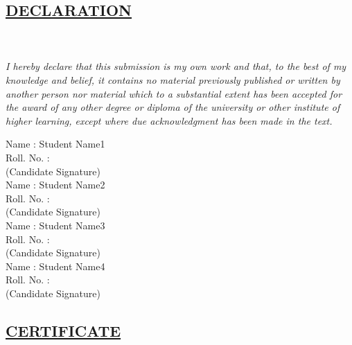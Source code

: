 \begin{center}
\chapter*{\size \underline{\textbf{DECLARATION}}}   
\end{center}\\
\\
\doublespacing
\textit{I hereby declare that this submission is my own work and that, to the best of my knowledge and belief, it contains no material previously published or written by another person nor material which to a substantial extent has been accepted for the award of any other degree or diploma of the university or other institute of higher learning, except where due acknowledgment has been made in the text.}
\\
\begin{flushleft}
Name : Student Name1\\
Roll. No. :   \\
\vspace{5mm}
(Candidate Signature) \\
\vspace{5mm}
Name : Student Name2\\
Roll. No. :   \\
\vspace{5mm}
(Candidate Signature) \\
\vspace{5mm}
Name : Student Name3\\
Roll. No. :   \\
\vspace{5mm}
(Candidate Signature) \\
\vspace{5mm}
Name : Student Name4\\
Roll. No. :   \\
\vspace{5mm}
(Candidate Signature) \\
\vspace{5mm}
\end{flushleft}
\restoregeometry
\newpage
\begin{center}
\chapter*{\size \underline {\textbf{CERTIFICATE}}} 
\end{center}\\
\\
